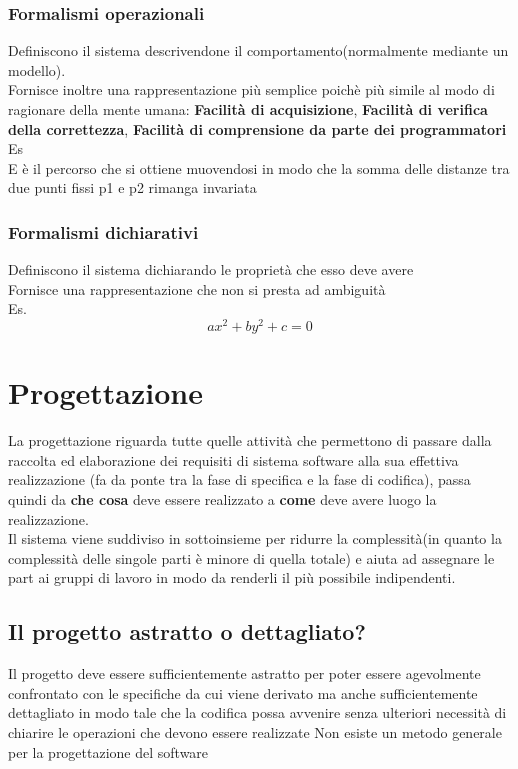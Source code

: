 \documentclass{report}
\begin{document}
                \subsubsection{Formalismi operazionali}
                    Definiscono il sistema descrivendone il comportamento(normalmente mediante un modello).
                    \\
                    Fornisce inoltre una rappresentazione più semplice poichè più simile al modo di ragionare della mente umana: \textbf{Facilità di acquisizione}, \textbf{Facilità di verifica della correttezza}, \textbf{Facilità di comprensione da parte dei programmatori} 
                    \\
                    Es
                    \\
                    E è il percorso che si ottiene muovendosi in modo che la somma delle distanze tra due punti fissi p1 e p2 rimanga invariata
                \subsubsection{Formalismi dichiarativi}
                    Definiscono il sistema dichiarando le proprietà che esso deve avere
                    \\
                    Fornisce una rappresentazione che non si presta ad ambiguità
                    \\
                    Es.
                    $$ax^2+by^2+c=0$$
        \section{Progettazione}
            La progettazione riguarda tutte quelle attività che permettono di passare dalla raccolta ed elaborazione dei requisiti di sistema software alla sua effettiva realizzazione (fa da ponte tra la fase di specifica e la fase di codifica), passa quindi da \textbf{che cosa} deve essere realizzato a \textbf{come} deve avere luogo la realizzazione.
            \\
            Il sistema viene suddiviso in sottoinsieme per ridurre la complessità(in quanto la complessità delle singole parti è minore di quella totale) e aiuta ad assegnare le part ai gruppi di lavoro in modo da renderli il più possibile indipendenti.
            \\
            \subsection{Il progetto astratto o dettagliato?}
                Il progetto deve essere sufficientemente astratto per poter essere agevolmente confrontato con le specifiche da cui viene derivato ma anche sufficientemente dettagliato in modo tale che la codifica possa avvenire senza ulteriori necessità di chiarire le operazioni che devono essere realizzate
            Non esiste un metodo generale per la progettazione del software
\end{document}
